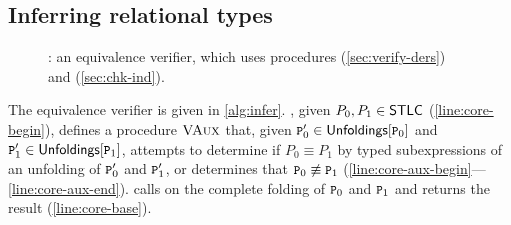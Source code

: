 \subsection{Inferring relational types}
\label{sec:infer-rel-types}

\begin{figure}
  \centering
\begin{algorithm}[H]
  { 
  }
  \caption{%
    \verify: an equivalence verifier, which uses procedures
    \verifybnd (\autoref{sec:verify-ders}) and %
    \chkinductive (\autoref{sec:chk-ind}).  }
  \label{alg:infer}
\end{algorithm}
\end{figure}

The equivalence verifier \verify is given in \autoref{alg:infer}.
%
\verify, given $P_0, P_1 \in \mathsf{STLC}$ (\autoref{line:core-begin}),
defines a procedure $\textsc{VAux}$ that, given $\cc{P}_0' \in
\unfoldings{ \cc{P}_0 }$ and $\cc{P}_1' \in \unfoldings{ \cc{P}_1 }$,
attempts to determine if $P_0 \equiv P_1$ by typed subexpressions of
an unfolding 
%
%
of $\cc{P}_0'$ and $\cc{P}_1'$, or determines that $\cc{P}_0
\not\equiv \cc{P}_1$
(\autoref{line:core-aux-begin}---\autoref{line:core-aux-end}).
%
\verify calls \verifyaux on the complete folding of $\cc{P}_0$ and
$\cc{P}_1$ and returns the result (\autoref{line:core-base}).

